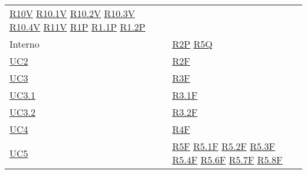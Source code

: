 \begin{center}
\begin{longtable}[!h]{m{50px} m{50px}}
        \newline \hyperref[tab:RequisitiVincolo]{R10V}
        \newline \hyperref[tab:RequisitiVincolo]{R10.1V}
        \newline \hyperref[tab:RequisitiVincolo]{R10.2V}
        \newline \hyperref[tab:RequisitiVincolo]{R10.3V}
        \newline \hyperref[tab:RequisitiVincolo]{R10.4V}
        \newline \hyperref[tab:RequisitiVincolo]{R11V}
        \newline \hyperref[tab:RequisitiPrestazionali]{R1P}
        \newline \hyperref[tab:RequisitiPrestazionali]{R1.1P}
        \newline \hyperref[tab:RequisitiPrestazionali]{R1.2P}                          \\

        Interno                           & \hyperref[tab:RequisitiPrestazionali]{R2P}
        \newline \hyperref[tab:RequisitiQualita]{R5Q}                                  \\

        \hyperref[sec:UC2]{UC2}           & \hyperref[tab:RequisitiFunzionali]{R2F}    \\
        \hyperref[sec:UC3]{UC3}           & \hyperref[tab:RequisitiFunzionali]{R3F}    \\
        \hyperref[sec:UC3.1]{UC3.1}       & \hyperref[tab:RequisitiFunzionali]{R3.1F}  \\
        \hyperref[sec:UC3.2]{UC3.2}       & \hyperref[tab:RequisitiFunzionali]{R3.2F}  \\
        \hyperref[sec:UC4]{UC4}           & \hyperref[tab:RequisitiFunzionali]{R4F}    \\

        \hyperref[sec:UC5]{UC5}           & \hyperref[tab:RequisitiFunzionali]{R5F}
        \newline \hyperref[tab:RequisitiFunzionali]{R5.1F}
        \newline \hyperref[tab:RequisitiFunzionali]{R5.2F}
        \newline \hyperref[tab:RequisitiFunzionali]{R5.3F}
        \newline \hyperref[tab:RequisitiFunzionali]{R5.4F}
        \newline \hyperref[tab:RequisitiFunzionali]{R5.6F}
        \newline \hyperref[tab:RequisitiFunzionali]{R5.7F}
        \newline \hyperref[tab:RequisitiFunzionali]{R5.8F}                             \\


\end{longtable}
\end{center}
